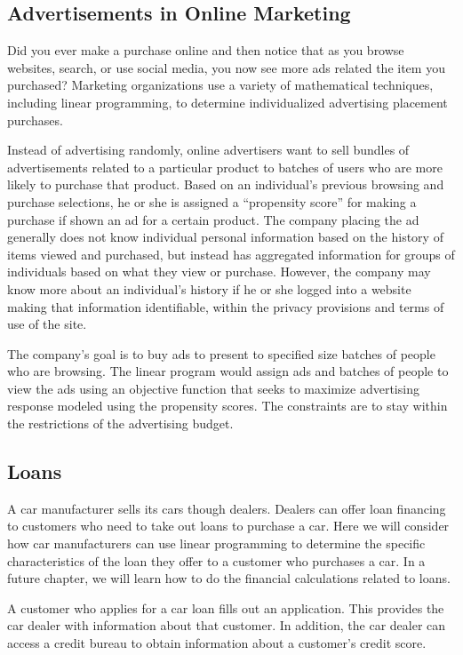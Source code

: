 \subsection{Advertisements in Online Marketing}

Did you ever make a purchase online and then notice that as you browse websites, search, or use social media, you now see more ads related the item you purchased? Marketing organizations use a variety of mathematical techniques, including linear programming, to determine individualized advertising placement purchases.

Instead of advertising randomly, online advertisers want to sell bundles of advertisements related to a particular product to batches of users who are more likely to purchase that product. Based on an individual's previous browsing and purchase selections, he or she is assigned a “propensity score” for making a purchase if shown an ad for a certain product. The company placing the ad generally does not know individual personal information based on the history of items viewed and purchased, but instead has aggregated information for groups of individuals based on what they view or purchase. However, the company may know more about an individual's history if he or she logged into a website making that information identifiable, within the privacy provisions and terms of use of the site.

The company's goal is to buy ads to present to specified size batches of people who are browsing. The linear program would assign ads and batches of people to view the ads using an objective function that seeks to maximize advertising response modeled using the propensity scores. The constraints are to stay within the restrictions of the advertising budget.

\subsection{Loans}

A car manufacturer sells its cars though dealers. Dealers can offer loan financing to customers who need to take out loans to purchase a car. Here we will consider how car manufacturers can use linear programming to determine the specific characteristics of the loan they offer to a customer who purchases a car. In a future chapter, we will learn how to do the financial calculations related to loans.

A customer who applies for a car loan fills out an application. This provides the car dealer with information about that customer. In addition, the car dealer can access a credit bureau to obtain information about a customer's credit score.

